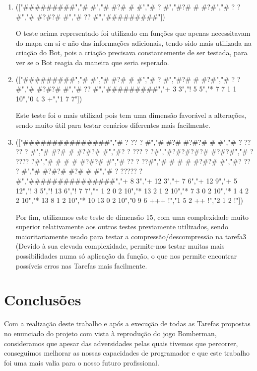 \documentclass[a4paper]{article}
\begin{document}
\begin{enumerate}

\item (["\#\#\#\#\#\#\#\#\#","\#       \#","\# \#?\# \# \#","\#     ? \#","\#?\# \# \#?\#","\# ?  ?  \#","\# \#?\#?\# \#","\#  ??   \#","\#\#\#\#\#\#\#\#\#"]) \par 
    O teste acima representado foi utilizado em funções que apenas necessitavam do mapa em si e não das informações adicionais, tendo sido mais utilizada na criação do Bot, pois a criação precisava constantemente de ser testada, para ver se o Bot reagia da maneira que seria esperado.

\item (["\#\#\#\#\#\#\#\#\#","\#       \#","\# \#?\# \# \#","\#     ? \#","\#?\# \# \#?\#","\# ?  ?  \#","\# \#?\#?\# \#","\#  ??   \#","\#\#\#\#\#\#\#\#\#","+ 3 3","! 5 5","* 7 7 1 1 10","0 4 3 +","1 7 7"]) \par
 Este teste foi o mais utilizad pois tem uma dimensão favorável a alterações, sendo muito útil para testar cenários diferentes mais facilmente.
\item (["\#\#\#\#\#\#\#\#\#\#\#\#\#\#\#","\#  ? ??  ?    \#","\# \#?\# \#?\#?\# \# \#","\# ?  ?? ??  ? \#","\# \#?\# \# \#?\#?\# \#","\#? ?  ???  ? ?\#","\#?\#?\#?\#?\# \#?\#?\#","\#   ? ????   ?\#","\# \# \# \# \#?\#?\# \#","\#  ?? ?     ??\#","\# \# \# \# \#?\#?\# \#","\#?  ??  ?     \#","\# \#?\#?\# \#?\# \# \#","\#  ? ????? ?  \#","\#\#\#\#\#\#\#\#\#\#\#\#\#\#\#","+ 8 3","+ 12 3","+ 7 6","+ 12 9","+ 5 12","! 3 5","! 13 6","! 7 7","* 1 2 0 2 10","* 13 2 1 2 10","* 7 3 0 2 10","* 1 4 2 2 10","* 13 8 1 2 10","* 10 13 0 2 10","0 9 6 +++ !","1 5 2 ++ !","2 1 2 !"]) \par 
Por fim, utilizamos este teste de dimensão 15, com uma complexidade muito superior relativamente aos outros testes previamente utilizados, sendo maioritariamente usado para testar a compressão/descompressão na tarefa3 (Devido à sua elevada complexidade, permite-nos testar muitas mais possibilidades numa só aplicação da função, o que nos permite encontrar possíveis erros nas Tarefas mais facilmente.

\end{enumerate} 
\newpage
\section{Conclusões}
\label{sec:conclusao}

Com a realização deste trabalho e após a execução de todas as Tarefas propostas no enunciado do projeto com vista à reprodução do jogo Bomberman, consideramos que apesar das adversidades pelas quais tivemos que percorrer, conseguimos melhorar as nossas capacidades de programador e que este trabalho foi uma mais valia para o nosso futuro profissional. 
\end{document}
